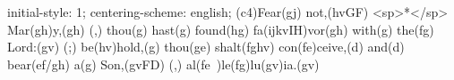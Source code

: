 initial-style: 1;
centering-scheme: english;
(c4)Fear(gj) not,(hvGF) <sp>*</sp> Mar(gh)y,(gh) (,) thou(g) hast(g) found(hg) fa(ijkvIH)vor(gh) with(g) the(fg) Lord:(gv) (;) be(hv)hold,(g) thou(ge) shalt(fghv) con(fe)ceive,(d) and(d) bear(ef/gh) a(g) Son,(gvFD) (,) al(fe~)le(fg)lu(gv)ia.(gv)
